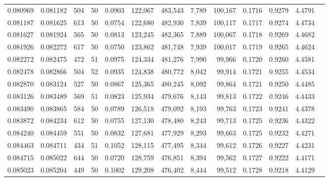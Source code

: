 \begin{tabular}{rrrrrrrrrrrrr}
0.080969 & 0.081182 &   504 &  50 &                                     0.0903 & 122,067 & 483,543 &   7,789 & 100,167 & 0.1716 & 0.9279 & 4.4791 \\
0.081187 & 0.081625 &   613 &  50 &                                     0.0754 & 122,680 & 482,930 &   7,839 & 100,117 & 0.1717 & 0.9274 & 4.4734 \\
0.081627 & 0.081924 &   565 &  50 &                                     0.0813 & 123,245 & 482,365 &   7,889 & 100,067 & 0.1718 & 0.9269 & 4.4682 \\
0.081926 & 0.082272 &   617 &  50 &                                     0.0750 & 123,862 & 481,748 &   7,939 & 100,017 & 0.1719 & 0.9265 & 4.4624 \\
0.082272 & 0.082475 &   472 &  51 &                                     0.0975 & 124,334 & 481,276 &   7,990 &  99,966 & 0.1720 & 0.9260 & 4.4581 \\
0.082478 & 0.082866 &   504 &  52 &                                     0.0935 & 124,838 & 480,772 &   8,042 &  99,914 & 0.1721 & 0.9255 & 4.4534 \\
0.082870 & 0.083124 &   527 &  50 &                                     0.0867 & 125,365 & 480,245 &   8,092 &  99,864 & 0.1721 & 0.9250 & 4.4485 \\
0.083126 & 0.083489 &   569 &  51 &                                     0.0823 & 125,934 & 479,676 &   8,143 &  99,813 & 0.1722 & 0.9246 & 4.4433 \\
0.083490 & 0.083865 &   584 &  50 &                                     0.0789 & 126,518 & 479,092 &   8,193 &  99,763 & 0.1723 & 0.9241 & 4.4378 \\
0.083872 & 0.084234 &   612 &  50 &                                     0.0755 & 127,130 & 478,480 &   8,243 &  99,713 & 0.1725 & 0.9236 & 4.4322 \\
0.084240 & 0.084459 &   551 &  50 &                                     0.0832 & 127,681 & 477,929 &   8,293 &  99,663 & 0.1725 & 0.9232 & 4.4271 \\
0.084463 & 0.084711 &   434 &  51 &                                     0.1052 & 128,115 & 477,495 &   8,344 &  99,612 & 0.1726 & 0.9227 & 4.4231 \\
0.084715 & 0.085022 &   644 &  50 &                                     0.0720 & 128,759 & 476,851 &   8,394 &  99,562 & 0.1727 & 0.9222 & 4.4171 \\
0.085023 & 0.085204 &   449 &  50 &                                     0.1002 & 129,208 & 476,402 &   8,444 &  99,512 & 0.1728 & 0.9218 & 4.4129 \\

\end{tabular}
